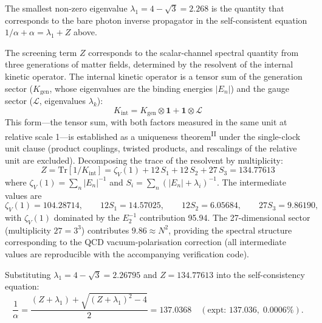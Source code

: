 \documentclass[12pt,a4paper]{article}
\newcommand{\PII}{\textsuperscript{\textup{II}}}
\begin{document}
The smallest non-zero eigenvalue $\lambda_1 = 4 - \sqrt{3} = 2.268$ is the quantity that corresponds to the bare photon inverse propagator in the self-consistent equation $1/\alpha + \alpha = \lambda_1 + Z$ above.

The screening term $Z$ corresponds to the scalar-channel spectral quantity from three generations of matter fields,
determined by the resolvent of the internal kinetic operator.
The internal kinetic operator is a tensor sum of the
generation sector ($K_\mathrm{gen}$, whose eigenvalues are the binding
energies $|E_n|$) and the gauge sector ($\mathcal{L}$, eigenvalues $\lambda_k$):
\[
  K_\mathrm{int} = K_\mathrm{gen} \otimes \mathbf{1}
    + \mathbf{1} \otimes \mathcal{L}
\]
This form---the tensor sum, with both factors measured in the same unit at relative scale 1---is established as a uniqueness theorem\PII{} under the single-clock unit clause (product couplings, twisted products, and rescalings of the relative unit are excluded). Decomposing the trace of the resolvent by multiplicity:
\[
  Z = \mathrm{Tr}[1/K_\mathrm{int}]
    = \zeta_V(1) + 12\,S_1 + 12\,S_2 + 27\,S_3 = 134.77613
\]
where $\zeta_V(1) = \sum_n |E_n|^{-1}$ and
$S_i = \sum_n (|E_n| + \lambda_i)^{-1}$.
The intermediate values are
\begin{equation}
  \zeta_V(1) = 104.28714,\qquad 12S_1 = 14.57025,\qquad 12S_2 = 6.05684,\qquad 27S_3 = 9.86190,
\end{equation}
with $\zeta_V(1)$ dominated by the $E_2^{-1}$ contribution 95.94.
The 27-dimensional sector (multiplicity $27 = 3^3$) contributes
$9.86 \approx N^2$, providing the spectral structure corresponding to the QCD vacuum-polarisation correction
(all intermediate values are reproducible with the
accompanying verification code).

Substituting $\lambda_1 = 4-\sqrt3 = 2.26795$ and $Z = 134.77613$ into the self-consistency equation:
\begin{equation}\label{eq:137}
  \frac{1}{\alpha} = \frac{(Z{+}\lambda_1)
    + \sqrt{(Z{+}\lambda_1)^2 - 4}}{2} = 137.0368
  \quad(\text{expt: } 137.036,\; 0.0006\%).
\end{equation}
\end{document}
